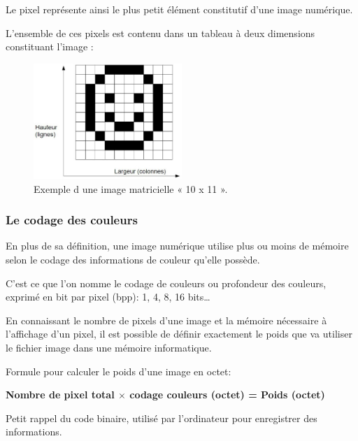 \documentclass[a4paper,12pt]{report}
\begin{document}
Le pixel représente ainsi le plus petit élément constitutif d’une image numérique.

L’ensemble de ces pixels est contenu dans un tableau à deux dimensions constituant l’image :
\begin{figure}[ht]
	\centering
	\includegraphics[width=0.5\textwidth]{matrix.jpg}
	\caption{Exemple d une image matricielle « 10 x 11 ».}
	\label{fig:matrix}
\end{figure}

\subsubsection*{Le codage des couleurs}
En plus de sa définition, une image numérique utilise plus ou moins de mémoire selon le codage des informations de couleur qu’elle possède.

C’est ce que l’on nomme le codage de couleurs ou profondeur des couleurs, exprimé en bit par pixel (bpp): 1, 4, 8, 16 bits…

En connaissant le nombre de pixels d’une image et la mémoire nécessaire à l’affichage d’un pixel, il est possible de définir exactement le poids que va utiliser le fichier image dans une mémoire informatique.

Formule pour calculer le poids d’une image en octet:

\begin{center}
	\textbf{Nombre de pixel total $\times$ codage couleurs (octet) = Poids (octet)}
\end{center}


Petit rappel du code binaire, utilisé par l’ordinateur pour enregistrer des informations.
\end{document}
